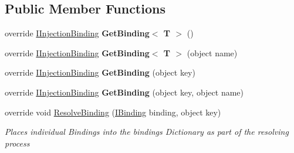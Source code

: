 \subsection*{Public Member Functions}
\begin{DoxyCompactItemize}
\item 
\hypertarget{classstrange_1_1extensions_1_1injector_1_1impl_1_1_cross_context_injection_binder_a46e2850751ef5b12efaa24945f3beedb}{override \hyperlink{interfacestrange_1_1extensions_1_1injector_1_1api_1_1_i_injection_binding}{I\-Injection\-Binding} {\bfseries Get\-Binding$<$ T $>$} ()}\label{classstrange_1_1extensions_1_1injector_1_1impl_1_1_cross_context_injection_binder_a46e2850751ef5b12efaa24945f3beedb}

\item 
\hypertarget{classstrange_1_1extensions_1_1injector_1_1impl_1_1_cross_context_injection_binder_afc81ee563347efaac210f42b3fbd78b6}{override \hyperlink{interfacestrange_1_1extensions_1_1injector_1_1api_1_1_i_injection_binding}{I\-Injection\-Binding} {\bfseries Get\-Binding$<$ T $>$} (object name)}\label{classstrange_1_1extensions_1_1injector_1_1impl_1_1_cross_context_injection_binder_afc81ee563347efaac210f42b3fbd78b6}

\item 
\hypertarget{classstrange_1_1extensions_1_1injector_1_1impl_1_1_cross_context_injection_binder_a08d5a9636e2e22b6d43ac50b31a6dba0}{override \hyperlink{interfacestrange_1_1extensions_1_1injector_1_1api_1_1_i_injection_binding}{I\-Injection\-Binding} {\bfseries Get\-Binding} (object key)}\label{classstrange_1_1extensions_1_1injector_1_1impl_1_1_cross_context_injection_binder_a08d5a9636e2e22b6d43ac50b31a6dba0}

\item 
\hypertarget{classstrange_1_1extensions_1_1injector_1_1impl_1_1_cross_context_injection_binder_a1f1987dd762c7feee56747cd4ceb7e90}{override \hyperlink{interfacestrange_1_1extensions_1_1injector_1_1api_1_1_i_injection_binding}{I\-Injection\-Binding} {\bfseries Get\-Binding} (object key, object name)}\label{classstrange_1_1extensions_1_1injector_1_1impl_1_1_cross_context_injection_binder_a1f1987dd762c7feee56747cd4ceb7e90}

\item 
override void \hyperlink{classstrange_1_1extensions_1_1injector_1_1impl_1_1_cross_context_injection_binder_ad93ea865f14a6249af575633f6472a7e}{Resolve\-Binding} (\hyperlink{interfacestrange_1_1framework_1_1api_1_1_i_binding}{I\-Binding} binding, object key)
\begin{DoxyCompactList}\small\item\em Places individual Bindings into the bindings Dictionary as part of the resolving process \end{DoxyCompactList}\end{DoxyCompactItemize}

